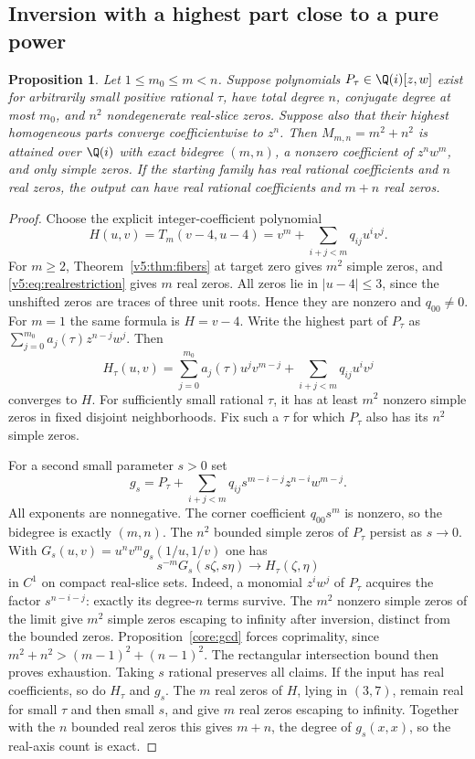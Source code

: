 \documentclass[UTF8,11pt]{ctexart}
\newtheorem{prop}[thm]{Proposition}
\theoremstyle{definition}
\numberwithin{equation}{section}
\begin{document}
\subsection{Inversion with a highest part close to a pure power}

\begin{prop}\label{v4:prop:transfer}
Let $1\le m_0\le m<n$. Suppose polynomials $P_\tau\in\Q(i)[z,w]$
exist for arbitrarily small positive rational $\tau$, have total
degree $n$, conjugate degree at most $m_0$, and $n^2$
nondegenerate real-slice zeros. Suppose also that their highest
homogeneous parts converge coefficientwise to $z^n$.
Then $M_{m,n}=m^2+n^2$ is attained over $\Q(i)$ with exact bidegree
$(m,n)$, a nonzero coefficient of $z^nw^m$, and only simple zeros.
If the starting family has real rational coefficients and $n$ real
zeros, the output can have real rational coefficients and $m+n$
real zeros.
\end{prop}
\begin{proof}
Choose the explicit integer-coefficient polynomial
\[
 H(u,v)=T_m(v-4,u-4)=v^m+\sum_{i+j<m}q_{ij}u^iv^j.
\]
For $m\ge2$, Theorem~\ref{v5:thm:fibers} at target zero gives
$m^2$ simple zeros, and \eqref{v5:eq:realrestriction} gives $m$
real zeros. All zeros lie in $|u-4|\le3$, since the unshifted
zeros are traces of three unit roots. Hence they are nonzero
and $q_{00}\ne0$. For $m=1$ the same formula is $H=v-4$.
Write the highest part of $P_\tau$ as
$\sum_{j=0}^{m_0}a_j(\tau)z^{n-j}w^j$. Then
\[
 H_\tau(u,v)=\sum_{j=0}^{m_0}a_j(\tau)u^jv^{m-j}
                    +\sum_{i+j<m}q_{ij}u^iv^j
\]
converges to $H$. For sufficiently small rational $\tau$, it has
at least $m^2$ nonzero simple zeros in fixed disjoint neighborhoods.
Fix such a $\tau$ for which $P_\tau$ also has its $n^2$ simple zeros.

For a second small parameter $s>0$ set
\begin{equation}\label{v4:eq:transfer}
 g_s=P_\tau+
       \sum_{i+j<m}q_{ij}s^{m-i-j}z^{n-i}w^{m-j}.
\end{equation}
All exponents are nonnegative. The corner coefficient
$q_{00}s^m$ is nonzero, so the bidegree is exactly $(m,n)$.
The $n^2$ bounded simple zeros of $P_\tau$ persist as $s\to0$.
With $G_s(u,v)=u^nv^mg_s(1/u,1/v)$ one has
\[
 s^{-m}G_s(s\zeta,s\eta)\longrightarrow H_\tau(\zeta,\eta)
\]
in $C^1$ on compact real-slice sets. Indeed, a monomial
$z^iw^j$ of $P_\tau$ acquires the factor $s^{n-i-j}$:
exactly its degree-$n$ terms survive. The $m^2$ nonzero simple
zeros of the limit give $m^2$ simple zeros escaping to infinity
after inversion, distinct from the bounded zeros.
Proposition~\ref{core:gcd} forces coprimality, since
$m^2+n^2>(m-1)^2+(n-1)^2$. The rectangular intersection bound
then proves exhaustion. Taking $s$ rational preserves all claims.
If the input has real coefficients, so do $H_\tau$ and $g_s$.
The $m$ real zeros of $H$, lying in $(3,7)$, remain real for
small $\tau$ and then small $s$, and give $m$ real zeros escaping
to infinity. Together with the $n$ bounded real zeros this gives
$m+n$, the degree of $g_s(x,x)$, so the real-axis count is exact.
\end{proof}
\end{document}
